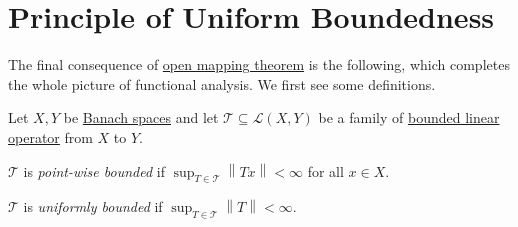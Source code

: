 \section{Principle of Uniform Boundedness}
The final consequence of \hyperref[thm:open-mapping]{open mapping theorem} is the following, which completes the whole picture of functional analysis. We first see some definitions.

\begin{definition*}
	Let \(X, Y\) be \hyperref[def:Banach-space]{Banach spaces} and let \(\mathcal{T} \subseteq \mathcal{L} (X, Y)\) be a family of \hyperref[def:bounded-linear-op]{bounded linear operator} from \(X\) to \(Y\).
	\begin{definition}\label{def:point-wise-bounded}
		\(\mathcal{T} \) is \emph{point-wise bounded} if \(\sup _{T\in \mathcal{T} } \left\lVert Tx\right\rVert < \infty\) for all \(x\in X\).
	\end{definition}
	\begin{definition}\label{def:uniformly-bounded}
		\(\mathcal{T} \) is \emph{uniformly bounded} if \(\sup _{T\in \mathcal{T} }\left\lVert T\right\rVert < \infty \).
	\end{definition}
\end{definition*}

